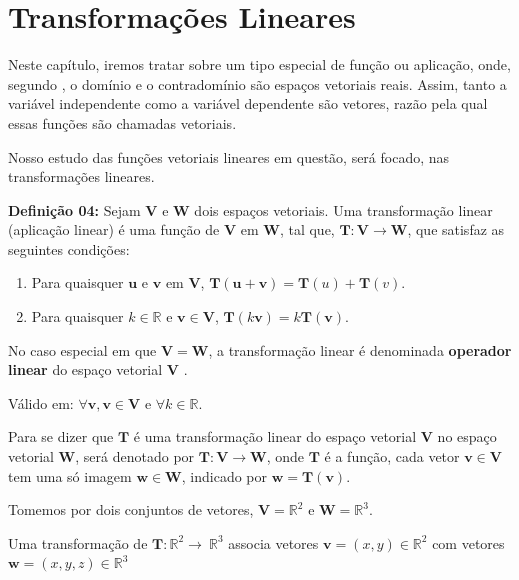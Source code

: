 \chapter{Transformações Lineares}
Neste capítulo, iremos tratar sobre um tipo especial de função ou aplicação, onde, segundo \cite{steinbruch1987}, o domínio e o contradomínio são espaços vetoriais reais. Assim, tanto a variável independente como a variável dependente são vetores, razão pela qual essas funções são chamadas vetoriais.

Nosso estudo das funções vetoriais lineares em questão, será focado, nas transformações lineares.

\noindent\textbf{Definição 04:} Sejam $\mathbf{V}$ e $\mathbf{W}$ dois espaços vetoriais. Uma transformação linear (aplicação linear) é uma função de $\mathbf{V}$ em $\mathbf{W}$, tal que, $\mathbf{T}: \mathbf{V} \rightarrow \mathbf{W}$, que satisfaz as seguintes condições:

\begin{enumerate}
	\item Para quaisquer $\mathbf{u}$ e $\mathbf{v}$ em $\mathbf{V}$, $\mathbf{T}(\mathbf{u} + \mathbf{v}) = \mathbf{T}(u) + \mathbf{T}(v)$.
	\item Para quaisquer $k \in \mathbb{R}$ e $\mathbf{v} \in \mathbf{V}$, $\mathbf{T}(k\mathbf{v}) = k\mathbf{T}(\mathbf{v})$.
\end{enumerate}	

No caso especial em que $\mathbf{V} = \mathbf{W}$, a transformação linear é denominada \textbf{operador linear} do espaço vetorial $\mathbf{V}$ \cite{anton2010elementary}.

\noindent\centerline{Válido em: $\forall \mathbf{v}, \mathbf{v} \in \mathbf{V}$ e $\forall k \in \mathbb{R}$. }

Para se dizer que $\mathbf{T}$ é uma transformação linear do espaço vetorial $\mathbf{V}$ no espaço vetorial $\mathbf{W}$, será denotado por $\mathbf{T}:\mathbf{V}\longrightarrow\mathbf{W}$, onde $\mathbf{T}$ é a função, cada vetor $\mathbf{v} \in \mathbf{V}$ tem uma só imagem $\mathbf{w} \in \mathbf{W}$, indicado por $\mathbf{w} = \mathbf{T}(\mathbf{v})$.

Tomemos por dois conjuntos de vetores, $\mathbf{V} = \mathbb{R}^2$ e $\mathbf{W} = \mathbb{R}^3$.

Uma transformação de $\mathbf{T}:\mathbb{R}^2\longrightarrow\ \mathbb{R}^3$ associa vetores $\mathbf{v} = (x, y) \in \mathbb{R}^2$ com vetores $\mathbf{w} = (x, y, z) \in \mathbb{R}^3$

